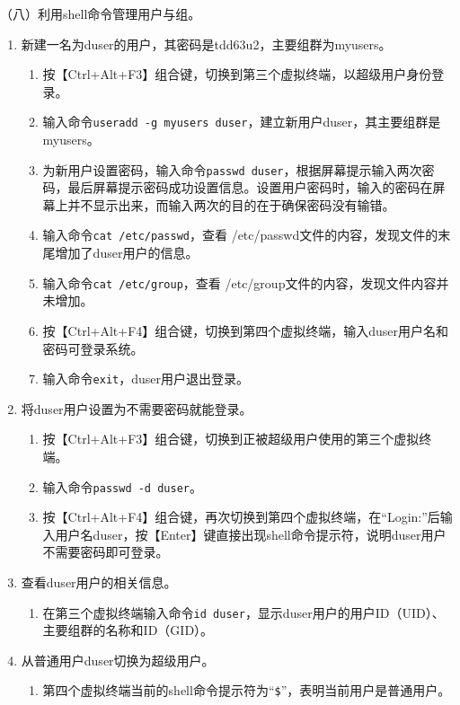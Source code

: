 \vspace{0.1in}
（八）利用shell命令管理用户与组。
\begin{enumerate}
  \item 新建一名为duser的用户，其密码是tdd63u2，主要组群为myusers。
    \begin{enumerate}
      \item 按【Ctrl+Alt+F3】组合键，切换到第三个虚拟终端，以超级用户身份登录。
      \item 输入命令\verb|useradd -g myusers duser|，建立新用户duser，其主要组群是myusers。
      \item 为新用户设置密码，输入命令\verb|passwd duser|，根据屏幕提示输入两次密码，最后屏幕提示密码成功设置信息。设置用户密码时，输入的密码在屏幕上并不显示出来，而输入两次的目的在于确保密码没有输错。
      \item 输入命令\verb|cat /etc/passwd|，查看 /etc/passwd文件的内容，发现文件的末尾增加了duser用户的信息。
      \item 输入命令\verb|cat /etc/group|，查看 /etc/group文件的内容，发现文件内容并未增加。
      \item 按【Ctrl+Alt+F4】组合键，切换到第四个虚拟终端，输入duser用户名和密码可登录系统。
      \item 输入命令\verb|exit|，duser用户退出登录。
    \end{enumerate}
  \item 将duser用户设置为不需要密码就能登录。
    \begin{enumerate}
      \item 按【Ctrl+Alt+F3】组合键，切换到正被超级用户使用的第三个虚拟终端。
      \item 输入命令\verb|passwd -d duser|。
      \item 按【Ctrl+Alt+F4】组合键，再次切换到第四个虚拟终端，在“Login:”后输入用户名duser，按【Enter】键直接出现shell命令提示符，说明duser用户不需要密码即可登录。
    \end{enumerate}
  \item 查看duser用户的相关信息。
    \begin{enumerate}
      \item 在第三个虚拟终端输入命令\verb|id duser|，显示duser用户的用户ID（UID）、主要组群的名称和ID（GID）。
    \end{enumerate}
  \item 从普通用户duser切换为超级用户。
    \begin{enumerate}
      \item 第四个虚拟终端当前的shell命令提示符为“\verb|$|”，表明当前用户是普通用户。

\end{enumerate}
\end{enumerate}
